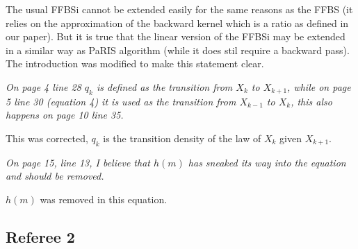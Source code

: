 \documentclass[12pt]{article}
\newcommand{\1}{\mathrm{1}}
\begin{document}
\vspace{.3cm}

The usual FFBSi cannot be extended easily for the same reasons as the FFBS (it relies on the approximation of the backward kernel which is a ratio as defined  in our paper). But it is true that the linear version of the FFBSi may be extended in a similar way as PaRIS algorithm (while it does stil require a backward pass). The introduction was modified to make this statement clear.

\vspace{1cm}

{\em On page 4 line 28 $q_k$ is defined as the transition from $X_k$ to $X_{k+1}$, while on page 5 line 30 (equation
4) it is used as the transition from $X_{k-1}$ to $X_k$, this also happens on page 10 line 35.}

\vspace{.3cm}

This was corrected, $q_k$ is the transition density of the law of $X_k$ given $X_{k+1}$.

\vspace{1cm}

{\em On page 15, line 13, I believe that $h(m)$ has sneaked its way into the equation and should be removed.}

\vspace{.3cm}
 $h(m)$ was removed in this equation. 

\subsection*{Referee 2}
\end{document}
